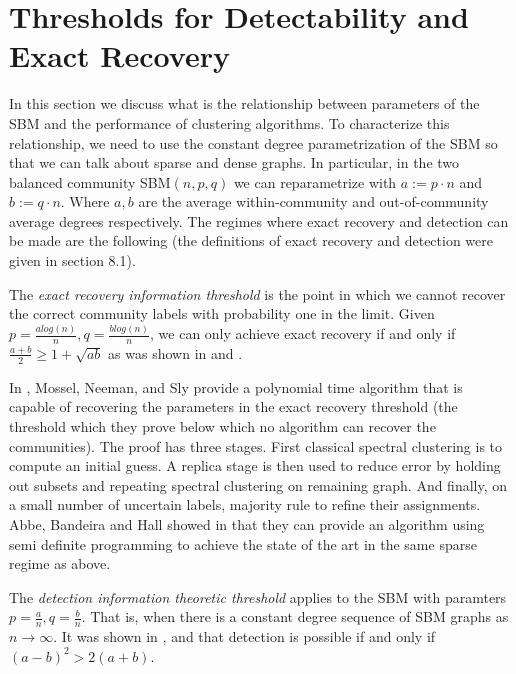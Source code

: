 \section{Thresholds for Detectability and Exact Recovery}
In this section we discuss what is the relationship between parameters of the SBM and the performance of clustering algorithms.  To characterize this relationship, we need to use the constant degree parametrization of the SBM so that we can talk about sparse and dense graphs.  In particular, in the two balanced community SBM$(n,p, q)$ we can reparametrize with $a :=  p \cdot n$ and $b := q \cdot n$.  Where $a, b$ are the average within-community and out-of-community average degrees respectively.  The regimes where exact recovery and detection can be made are the following (the definitions of exact recovery and detection were given in section 8.1). 

\begin{definition}The \textit{exact recovery information threshold} is the point in which we cannot  recover the correct community labels with probability one in the limit.  Given $p=\frac{alog(n)}{n}, q = \frac{b log(n)}{n}$, we can only achieve exact recovery if and only if $\frac{a+b}{2} \geq 1 + \sqrt{ab}$ as was shown in \cite{MNS} and \cite{ABH}. 
\end{definition}

 In \cite{MNS}, Mossel, Neeman, and Sly provide a polynomial time algorithm that is capable of recovering the parameters in the exact recovery threshold (the threshold which they prove below which no algorithm can recover the communities).  The proof has three stages. First classical spectral clustering is to compute an initial guess. A replica stage is then used to reduce error by holding out subsets and repeating spectral clustering on remaining graph.  And finally, on a small number of uncertain labels, majority rule to refine their assignments. Abbe, Bandeira and Hall showed in \cite{ABH} that they can provide an algorithm using semi definite programming to achieve the state of the art in the same sparse regime as above. 

\begin{definition}
The \textit{detection information theoretic threshold} applies to the SBM with paramters $p = \frac{a}{n}, q = \frac{b}{n}$. That is, when there is a constant degree sequence of SBM graphs as $n\rightarrow \infty$. It was shown in \cite{MNS_sparse}, \cite{Massouli} and \cite{AFL} that detection is possible if and only if $(a-b)^2 > 2(a+b)$.
\end{definition}

